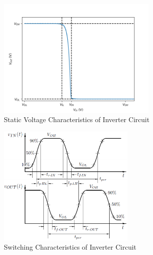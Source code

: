\documentclass[12pt]{../manual}
\begin{document}
\begin{figure}[ht!]
\centering
\includegraphics[width=0.7\textwidth]{./figures/staticCharacteristicsInverter.png}
\caption{Static Voltage Characteristics of Inverter Circuit}
\label{fig:static}
\end{figure}

\begin{figure}[ht!]
\centering
\includegraphics[width=0.6\textwidth]{./figures/switchCharInv.png}
\caption{Switching Characteristics of Inverter Circuit}
\label{fig:switch}
\end{figure}


\newpage
\end{document}
